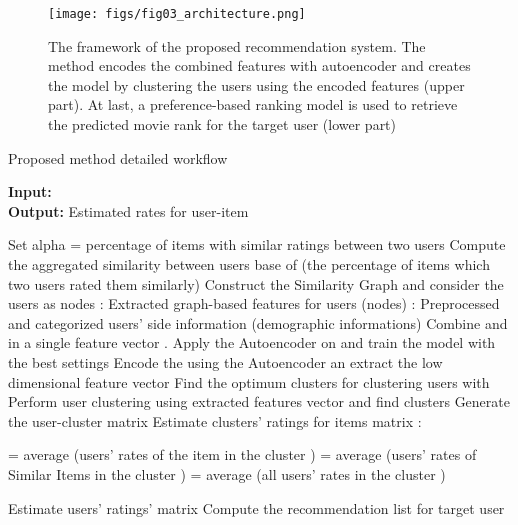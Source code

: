 \documentclass[a4paper,fleqn]{cas-dc}
\begin{document}
\begin{figure*}
	\centering
	\texttt{[image: figs/fig03\_architecture.png]}
	\caption{The framework of the proposed recommendation system. The method encodes the combined features with autoencoder and creates the model by clustering the users using the encoded features (upper part). At last, a preference-based ranking model is used to retrieve the predicted movie rank for the target user (lower part)}
	\label{FIG:03}
\end{figure*}

\begin{algorithm}
	\caption{Proposed method detailed workflow}
	\label{ALG:01}

	\hspace*{\algorithmicindent} \textbf{Input:}  \\
	\hspace*{\algorithmicindent} \textbf{Output:} Estimated rates for user-item

	\begin{algorithmic}[1]

		\State Set alpha = percentage of items with similar ratings between two users
		\State Compute the aggregated similarity between users base of  (the percentage of items which two users rated them similarly)
		\State Construct the Similarity Graph and consider the users as nodes
		\State : Extracted graph-based features for users (nodes)
		\State : Preprocessed and categorized users' side information (demographic informations)
		\State Combine  and  in a single feature vector .
		Apply the Autoencoder on  and train the model with the best settings
		\State Encode the  using the Autoencoder an extract the low dimensional feature vector 
		\State Find the optimum clusters for clustering users with 
		\State Perform user clustering using extracted features vector  and find clusters 
		\State Generate the user-cluster matrix 
		\State Estimate clusters' ratings for items matrix :

		\State  = average (users' rates of the item  in the cluster )
		\State  = average (users' rates of Similar Items in the cluster )
		\Else
		\State  = average (all users' rates in the cluster )
		\EndIf



		\State Estimate users' ratings' matrix 
		\State Compute the recommendation list for target user 

	\end{algorithmic}


\end{algorithm}
\end{document}
